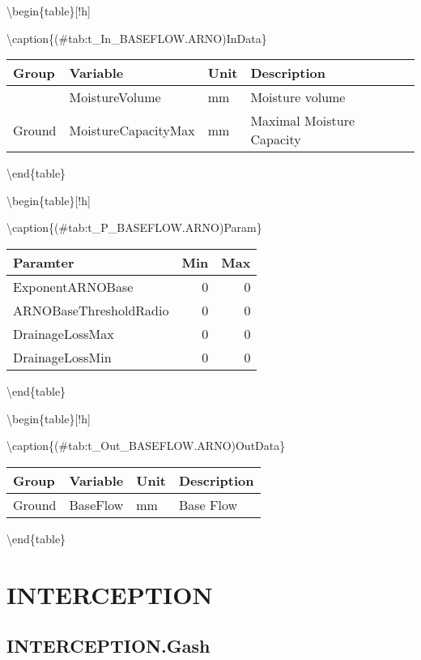 \documentclass[
]{book}
\begin{document}
\textbackslash begin\{table\}{[}!h{]}

\textbackslash caption\{(\#tab:t\_In\_BASEFLOW.ARNO)InData\}
\centering

\begin{tabular}[t]{l|l|l|l}
\hline
Group & Variable & Unit & Description\\
\hline
 & MoistureVolume & mm & Moisture volume\\
\cline{2-4}
\multirow{-2}{*}{\raggedright\arraybackslash Ground} & MoistureCapacityMax & mm & Maximal Moisture Capacity\\
\hline
\end{tabular}

\textbackslash end\{table\}

\textbackslash begin\{table\}{[}!h{]}

\textbackslash caption\{(\#tab:t\_P\_BASEFLOW.ARNO)Param\}
\centering

\begin{tabular}[t]{l|r|r}
\hline
Paramter & Min & Max\\
\hline
ExponentARNOBase & 0 & 0\\
\cline{1-3}
ARNOBaseThresholdRadio & 0 & 0\\
\cline{1-3}
DrainageLossMax & 0 & 0\\
\cline{1-3}
DrainageLossMin & 0 & 0\\
\hline
\end{tabular}

\textbackslash end\{table\}

\textbackslash begin\{table\}{[}!h{]}

\textbackslash caption\{(\#tab:t\_Out\_BASEFLOW.ARNO)OutData\}
\centering

\begin{tabular}[t]{l|l|l|l}
\hline
Group & Variable & Unit & Description\\
\hline
Ground & BaseFlow & mm & Base Flow\\
\hline
\end{tabular}

\textbackslash end\{table\}

\hypertarget{interception}{%
\section{INTERCEPTION}\label{interception}}

\hypertarget{interception.gash}{%
\subsection{INTERCEPTION.Gash}\label{interception.gash}}
\end{document}
